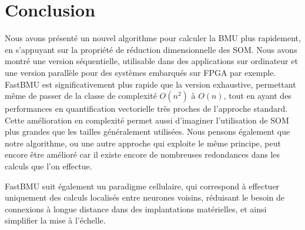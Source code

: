 	\section{Conclusion}

	Nous avons présenté un nouvel algorithme pour calculer la BMU plus rapidement, en s'appuyant sur la propriété de réduction dimensionnelle des SOM. Nous avons montré une version séquentielle, utilisable dans des applications sur ordinateur et une version parallèle pour des systèmes embarqués sur FPGA par exemple. FastBMU est significativement plus rapide que la version exhaustive, permettant même de passer de la classe de complexité $O(n^2)$ à $O(n)$, tout en ayant des performances en quantification vectorielle très proches de l'approche standard. Cette amélioration en complexité permet aussi d'imaginer l'utilisation de SOM plus grandes que les tailles généralement utilisées. Nous pensons également que notre algorithme, ou une autre approche qui exploite le même principe, peut encore être amélioré car il existe encore de nombreuses redondances dans les calculs que l'on effectue.

	FastBMU suit également un paradigme cellulaire, qui correspond à effectuer uniquement des calculs localisés entre neurones voisins, réduisant le besoin de connexions à longue distance dans des implantations matérielles, et ainsi simplifier la mise à l'échelle.
		

